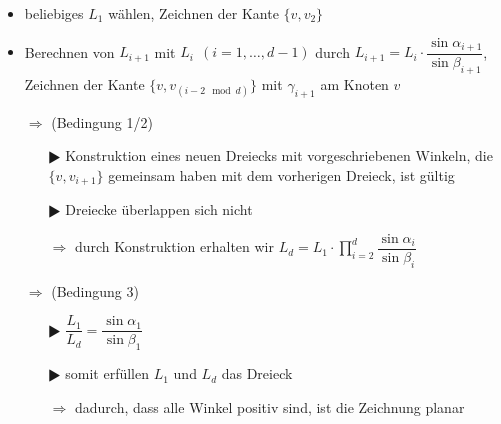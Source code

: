 \begin{itemize}[itemsep=-1pt]
\begin{itemize}[itemsep=-1pt]
		\item beliebiges $L_1$ wählen, Zeichnen der Kante $\{v,v_2\}$
		\item Berechnen von $L_{i+1}$ mit $L_i~~(i=1,\dots,d-1)$ durch $L_{i+1}=L_i\cdot\dfrac{\sin\alpha_{i+1}}{\sin\beta_{i+1}}$,\\
		Zeichnen der Kante $\{v,v_{(i-2\mod d)}\}$ mit $\gamma_{i+1}$ am Knoten $v$
		\item[$\Rightarrow$] (Bedingung 1/2)
			\begin{itemize}[itemsep=-1pt]
				\item[$\RHD$] Konstruktion eines neuen Dreiecks mit vorgeschriebenen Winkeln, die $\{v,v_{i+1}\}$ gemeinsam haben mit dem vorherigen Dreieck, ist gültig
				\item[$\RHD$] Dreiecke überlappen sich nicht 
				\item[$\Rightarrow$] durch Konstruktion erhalten wir $L_d=L_1\cdot \prod\limits_{i=2}^{d}\dfrac{\sin\alpha_i}{\sin\beta_i}$
			\end{itemize}
		\item[$\Rightarrow$] (Bedingung 3)
		\begin{itemize}
			\item[$\RHD$] $\dfrac{L_1}{L_d}=\dfrac{\sin\alpha_1}{\sin\beta_1}$
			\item[$\RHD$] somit erfüllen $L_1$ und $L_d$ das Dreieck
			\item[$\Rightarrow$] dadurch, dass alle Winkel positiv sind, ist die Zeichnung planar
		\end{itemize}
	\end{itemize}
\end{itemize}